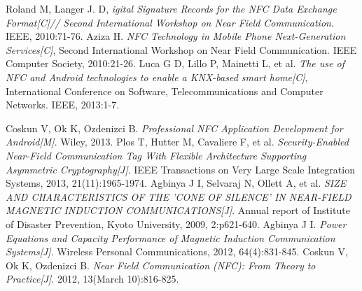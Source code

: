 \documentclass[journal]{IEEEtran}
\begin{document}
\begin{thebibliography}{1}
Roland M, Langer J. D, \emph{igital Signature Records for the NFC Data Exchange Format[C]// Second International Workshop on Near Field Communication}. IEEE, 2010:71-76.
Aziza H. \emph{NFC Technology in Mobile Phone Next-Generation Services[C]}, Second International Workshop on Near Field Communication. IEEE Computer Society, 2010:21-26.
Luca G D, Lillo P, Mainetti L, et al. \emph{The use of NFC and Android technologies to enable a KNX-based smart home[C]}, International Conference on Software, Telecommunications and Computer Networks. IEEE, 2013:1-7.

Coskun V, Ok K, Ozdenizci B. \emph{Professional NFC Application Development for Android[M]}. Wiley, 2013.
Plos T, Hutter M, Cavaliere F, et al. \emph{Security-Enabled Near-Field Communication Tag With Flexible Architecture Supporting Asymmetric Cryptography[J]}. IEEE Transactions on Very Large Scale Integration Systems, 2013, 21(11):1965-1974.
Agbinya J I, Selvaraj N, Ollett A, et al.\emph{ SIZE AND CHARACTERISTICS OF THE 'CONE OF SILENCE' IN NEAR-FIELD MAGNETIC INDUCTION COMMUNICATIONS[J]}. Annual report of Institute of Disaster Prevention, Kyoto University, 2009, 2:p621-640.
Agbinya J I. \emph{Power Equations and Capacity Performance of Magnetic Induction Communication Systems[J]}. Wireless Personal Communications, 2012, 64(4):831-845.
Coskun V, Ok K, Ozdenizci B. \emph{Near Field Communication (NFC): From Theory to Practice[J]}. 2012, 13(March 10):816-825.


\end{thebibliography}
\end{document}

